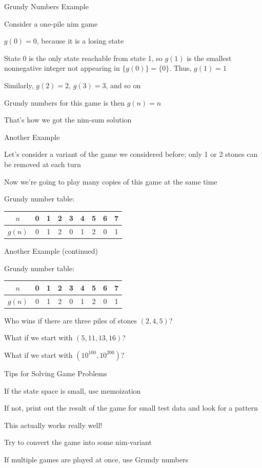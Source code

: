 \documentclass[13pt,onlymath]{beamer}
\begin{document}
\begin{frame}{Grundy Numbers Example}
\BIT
\item Consider a one-pile nim game
\item $g(0) = 0$, because it is a losing state
\item State 0 is the only state reachable from state 1, so $g(1)$ is the smallest nonnegative integer not appearing in $\{g(0)\} = \{0\}$. Thus, $g(1) = 1$
\item Similarly, $g(2) = 2$, $g(3) = 3$, and so on
\item Grundy numbers for this game is then $g(n) = n$
\BIT
\item That's how we got the nim-sum solution
\EIT
\EIT
\end{frame}

\begin{frame}{Another Example}
\BIT
\item Let's consider a variant of the game we considered before; only 1 or 2 stones can be removed at each turn
\item Now we're going to play many copies of this game at the same time
\item Grundy number table:

\begin{center}
\begin{tabular}{|c|cccccccc|}
\hline
$n$&0&1&2&3&4&5&6&7 \\ \hline
$g(n)$&0&1&2&0&1&2&0&1 \\
\hline
\end{tabular}
\end{center}
\EIT
\end{frame}

\begin{frame}{Another Example (continued)}
\BIT
\item Grundy number table:

\begin{center}
\begin{tabular}{|c|cccccccc|}
\hline
$n$&0&1&2&3&4&5&6&7 \\ \hline
$g(n)$&0&1&2&0&1&2&0&1 \\
\hline
\end{tabular}
\end{center}
\vfill
\item Who wins if there are three piles of stones $(2, 4, 5)$?
\item What if we start with $(5, 11, 13, 16)$?
\item What if we start with $(10^{100}, 10^{200})$?
\EIT
\end{frame}

\begin{frame}{Tips for Solving Game Problems}
\BIT
\item If the state space is small, use memoization
\item If not, print out the result of the game for small test data and look for a pattern
\BIT
\item This actually works really well!
\EIT
\item Try to convert the game into some nim-variant
\item If multiple games are played at once, use Grundy numbers
\EIT
\end{frame}
\end{document}
